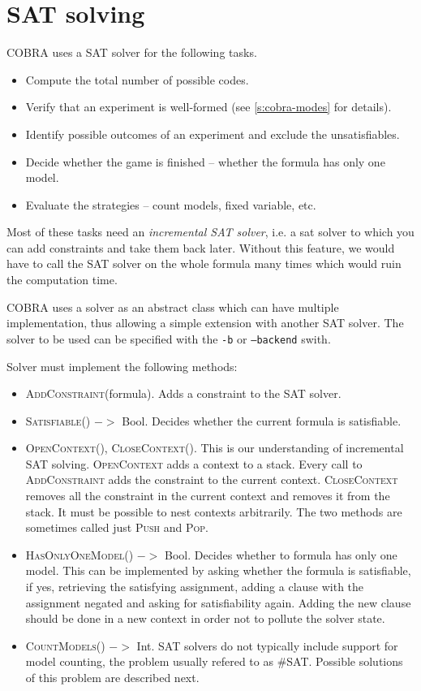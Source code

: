 \section{SAT solving} \label{s:cobra-sat}

COBRA uses a SAT solver for the following tasks.
\begin{itemize}
\item Compute the total number of possible codes.
\item Verify that an experiment is well-formed (see \autoref{s:cobra-modes} for details).
\item Identify possible outcomes of an experiment and exclude the unsatisfiables.
\item Decide whether the game is finished -- whether the formula has only one model.
\item Evaluate the strategies -- count models, fixed variable, etc.
\end{itemize}

Most of these tasks need an \emph{incremental SAT solver}, i.e. a
  sat solver to which you can add constraints and take them back later.
Without this feature, we would have to call the SAT solver on the whole formula
  many times which would ruin the computation time.

COBRA uses a solver as an abstract class which can have multiple implementation,
  thus allowing a simple extension with another SAT solver.
The solver to be used can be specified with
  the \texttt{-b} or \texttt{--backend} swith.

Solver must implement the following methods:
\begin{itemize}
\item \textsc{AddConstraint}(formula). Adds a constraint to the SAT solver.
\item \textsc{Satisfiable()} $->$ Bool. Decides whether the current formula is satisfiable.
\item \textsc{OpenContext(), CloseContext()}.
  This is our understanding of incremental SAT solving.
  \textsc{OpenContext} adds a context to a stack.
  Every call to \textsc{AddConstraint} adds the constraint to the current context.
  \textsc{CloseContext} removes all the constraint in the current context and removes it
  from the stack. It must be possible to nest contexts arbitrarily.
  The two methods are sometimes called just \textsc{Push} and \textsc{Pop}.
\item \textsc{HasOnlyOneModel()} $->$ Bool. Decides whether to formula has only one model.
  This can be implemented by asking whether the formula is satisfiable,
  if yes, retrieving the satisfying assignment, adding
  a clause with the assignment negated and asking for satisfiability again.
  Adding the new clause should be done in a new context in order not to pollute
  the solver state.
\item \textsc{CountModels()} $->$ Int.
   SAT solvers do not typically include support for model counting, the problem
   usually refered to as \#SAT. Possible solutions of this problem are described next.
\end{itemize}

